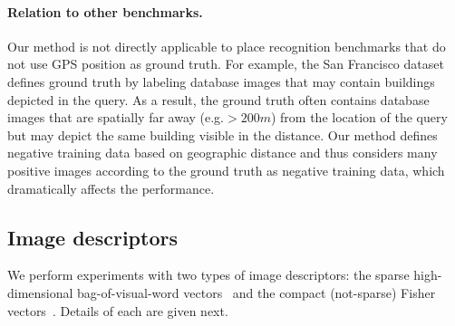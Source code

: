       \paragraph{Relation to other benchmarks.}
       Our method is not directly applicable to place recognition benchmarks that do not use GPS position as ground truth. For example, the San Francisco dataset~\cite{Chen11} defines ground truth by labeling database images that may contain buildings depicted in the query. As a result, the ground truth often contains database images that are spatially far away (e.g.$> 200m$) from the location of the query but may depict the same building visible in the distance.  Our method defines negative training data based on geographic distance and thus considers many positive images according to the ground truth as negative training data, which dramatically affects the performance.   
      

    \subsection{Image descriptors}
      We perform experiments with two types of image descriptors: the sparse high-dimensional bag-of-visual-word vectors~\cite{Sivic03} and the compact (not-sparse) Fisher vectors~\cite{Jegou12}. Details of each are given next.

